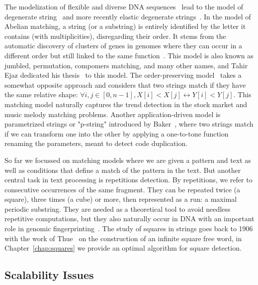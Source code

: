 The modelization of flexible and diverse DNA sequences~\cite{comm1970iupac} lead to the model of degenerate string~\cite{abrahamson1987generalized} and more recently elastic degenerate strings~\cite{iliopoulos2021efficient}.
In the model of Abelian matching, a string (or a substring) is entirely identified by the letter it contains (with multiplicities), disregarding their order. It stems from the automatic discovery of clusters of genes in genomes where they can occur in a different order but still linked to the same function~\cite{eres2004permutation}. This model is also known as jumbled, permutation, compomers matching, and many other names, and Tahir Ejaz dedicated his thesis~\cite{ejaz2010abelian} to this model.
The order-preserving model~\cite{kim2014order,kubica2013linear} takes a somewhat opposite approach and considers that two strings match if they have the same relative shape: $\forall i,j \in [0,n-1], X[i] < X[j] \leftrightarrow Y[i] < Y[j]$. This matching model naturally captures the trend detection in the stock market and music melody matching problems.
%
Another application-driven model is parametrized strings or "p-string" introduced by Baker~\cite{baker1993theory}, where two strings match if we can transform one into the other by applying a one-to-tone function renaming the parameters, meant to detect code duplication.

So far we focussed on matching models where we are given a pattern and text as well as conditions that define a match of the pattern in the text. But another central task in text processing is repetitions detection. By repetitions, we refer to consecutive occurrences of the same fragment. They can be repeated twice (a square), three times (a cube) or more, then represented as a run: a maximal periodic substring. They are needed as a theoretical tool to avoid needless repetitive computations, but they also naturally occur in DNA with an important role in genomic fingerprinting~\cite{Kolpakov2003}.
The study of squares in strings goes back to 1906 with the work of Thue~\cite{thue1906} on the construction of an infinite square free word, in Chapter~\ref{chap:squares} we provide an optimal algorithm for square detection.

\subsection{Scalability Issues}

